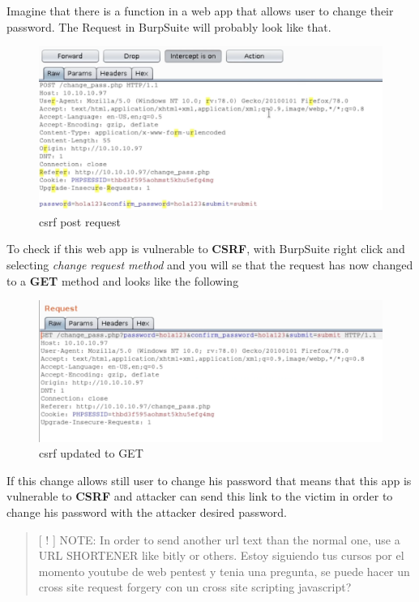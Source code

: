 \documentclass{assets/ipesethesis}
\begin{document}
Imagine that there is a function in a web app that allows user to change their password. The Request in BurpSuite will probably look like that.

\begin{figure}
\includegraphics[width=0.9\linewidth]{images/csrf-post} \caption{csrf post request}\label{fig:unnamed-chunk-5}
\end{figure}

To check if this web app is vulnerable to \textbf{CSRF}, with BurpSuite right click and selecting \emph{change request method} and you will se that the
request has now changed to a \textbf{GET} method and looks like the following

\begin{figure}
\includegraphics[width=0.9\linewidth]{images/csrf-get} \caption{csrf updated to GET}\label{fig:unnamed-chunk-6}
\end{figure}

If this change allows still user to change his password that means that this app is vulnerable to \textbf{CSRF} and attacker can send this link to
the victim in order to change his password with the attacker desired password.

\begin{quote}
{[} ! {]} NOTE: In order to send another url text than the normal one, use a URL SHORTENER like bitly or others.
\citet{S4vitaar} Estoy siguiendo tus cursos por el momento youtube de web pentest y tenia una pregunta, se puede hacer un cross site request forgery con un cross site scripting javascript?
\end{quote}
\end{document}
